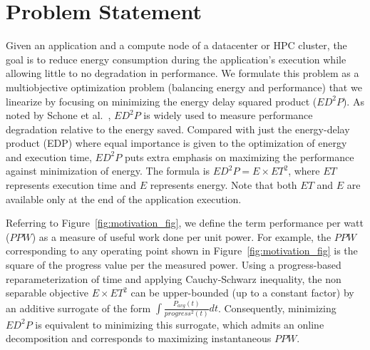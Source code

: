 \section{Problem Statement} \label{sec:Problem}
Given an application and a compute node of a datacenter or HPC cluster, the goal is to reduce energy consumption during the application's execution while allowing little to no degradation in performance. We formulate this problem as a multiobjective optimization problem (balancing energy and performance) that we linearize by focusing on minimizing the energy delay squared product ($ED^2P$).
%
As noted by Schone et al.~\cite{schone2014tools}, $ED^2P$ is widely used to measure performance degradation relative to the energy saved.
Compared with just the energy-delay product (EDP) where equal importance is given to the optimization of energy and execution time, $ED^2P$ puts extra emphasis on maximizing the performance against minimization of energy. The formula is $ED^2P = E \times ET^2 $, where $ET$ represents execution time and $E$ represents energy. Note that both $ET$ and $E$ are  available only at the end of the application execution.

Referring to Figure~\ref{fig:motivation_fig}, we define the term performance per watt ($PPW$) as a measure of useful work done per unit power. For example, the $PPW$ corresponding to any operating point shown in Figure~\ref{fig:motivation_fig} is the square of the progress value per the measured power. 
Using a progress-based reparameterization of time and applying Cauchy-Schwarz inequality, the non separable objective $E \times ET^2$ can be upper-bounded (up to a constant factor) by an additive surrogate of the form $\int\frac{P_{avg}(t)}{progress^2(t)}dt$. Consequently, minimizing $ED^2P$ is equivalent to minimizing this surrogate, which admits an online decomposition and corresponds to maximizing instantaneous $PPW$.
%
%
